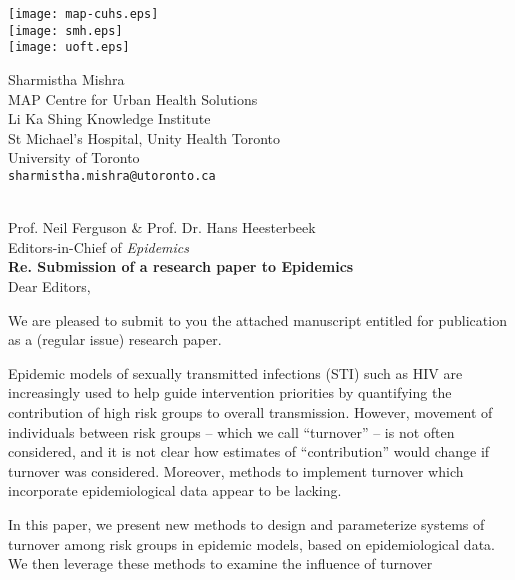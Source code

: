\documentclass[a4]{article}
\begin{document}
\begin{minipage}{0.5\linewidth}
  \texttt{[image: map-cuhs.eps]}\\[1em]
  \texttt{[image: smh.eps]}\\[1em]
  \texttt{[image: uoft.eps]}
\end{minipage}%
\begin{minipage}{0.5\linewidth}
  \begin{flushright}
    Sharmistha Mishra\\
    MAP Centre for Urban Health Solutions\\
    Li Ka Shing Knowledge Institute\\
    St Michael's Hospital,
    Unity Health Toronto\\
    University of Toronto\\
    \texttt{sharmistha.mishra@utoronto.ca}
  \end{flushright}
\end{minipage}
\\[2em]
Prof. Neil Ferguson \& Prof. Dr. Hans Heesterbeek\\
Editors-in-Chief of \textit{Epidemics}\\[1em]
\textbf{Re. Submission of a research paper to Epidemics}\\[1em]
Dear Editors,
\par
We are pleased to submit to you the attached manuscript entitled
\textit{}%
for publication as a (regular issue) research paper.
\par
Epidemic models of sexually transmitted infections (STI) such as HIV
are increasingly used to help guide intervention priorities
by quantifying the contribution of high risk groups to overall transmission.
However, movement of individuals between risk groups
-- which we call ``turnover'' --
is not often considered, and it is not clear how
estimates of ``contribution'' would change if turnover was considered.
Moreover, methods to implement turnover which incorporate epidemiological data
appear to be lacking.
\par
In this paper, we present new methods to design and parameterize
systems of turnover among risk groups in epidemic models,
based on epidemiological data.
We then leverage these methods to examine the influence of turnover
\end{document}
